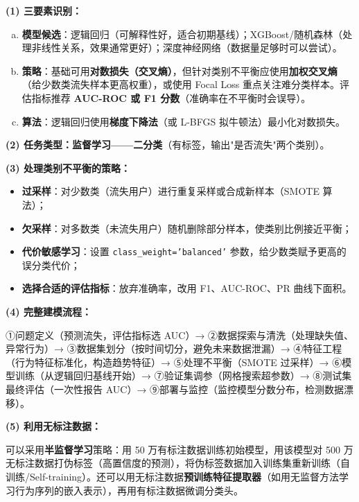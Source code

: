 \documentclass[a4paper,11pt]{ctexart}
\begin{document}
\begin{solutionbox}[参考答案与详细解析]
    \textbf{(1) 三要素识别：}
    \begin{enumerate}[a.]
        \item \textbf{模型候选}：逻辑回归（可解释性好，适合初期基线）；XGBoost/随机森林（处理非线性关系，效果通常更好）；深度神经网络（数据量足够时可以尝试）。
        \item \textbf{策略}：基础可用\textbf{对数损失（交叉熵）}，但针对类别不平衡应使用\textbf{加权交叉熵}（给少数类流失样本更高权重），或使用 Focal Loss 重点关注难分类样本。评估指标推荐 \textbf{AUC-ROC 或 F1 分数}（准确率在不平衡时会误导）。
        \item \textbf{算法}：逻辑回归使用\textbf{梯度下降法}（或 L-BFGS 拟牛顿法）最小化对数损失。
    \end{enumerate}

    \textbf{(2) 任务类型：监督学习——二分类}（有标签，输出"是否流失"两个类别）。

    \textbf{(3) 处理类别不平衡的策略：}
    \begin{itemize}
        \item \textbf{过采样}：对少数类（流失用户）进行重复采样或合成新样本（SMOTE 算法）；
        \item \textbf{欠采样}：对多数类（未流失用户）随机删除部分样本，使类别比例接近平衡；
        \item \textbf{代价敏感学习}：设置 \texttt{class\_weight='balanced'} 参数，给少数类赋予更高的误分类代价；
        \item \textbf{选择合适的评估指标}：放弃准确率，改用 F1、AUC-ROC、PR 曲线下面积。
    \end{itemize}

    \textbf{(4) 完整建模流程：}

    ①问题定义（预测流失，评估指标选 AUC）→ ②数据探索与清洗（处理缺失值、异常行为）→ ③数据集划分（按时间切分，避免未来数据泄漏）→ ④特征工程（行为特征标准化，构造趋势特征）→ ⑤处理不平衡（SMOTE 过采样）→ ⑥模型训练（从逻辑回归基线开始）→ ⑦验证集调参（网格搜索超参数）→ ⑧测试集最终评估（一次性报告 AUC）→ ⑨部署与监控（监控模型分数分布，检测数据漂移）。

    \textbf{(5) 利用无标注数据：}

    可以采用\textbf{半监督学习}策略：用 50 万有标注数据训练初始模型，用该模型对 500 万无标注数据打伪标签（高置信度的预测），将伪标签数据加入训练集重新训练（自训练/Self-training）。还可以用无标注数据\textbf{预训练特征提取器}（如用无监督方法学习行为序列的嵌入表示），再用有标注数据微调分类头。
\end{solutionbox}
\end{document}

